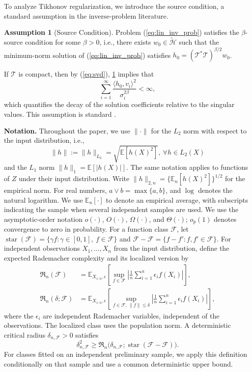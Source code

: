 \documentclass[12pt]{article}
\theoremstyle{plain}
\theoremstyle{definition}
\newtheorem{assumption}[theorem]{Assumption}
\theoremstyle{remark}
\begin{document}
To analyze Tikhonov regularization, we introduce the source condition, a standard assumption in the inverse-problem literature. 
\begin{assumption}[Source Condition]\label{asp:source_condition}
Problem (\ref{eq:lin_inv_prob}) satisfies the $ \beta $-source condition for some $ \beta  >0$, i.e., there exists $ w_{0} \in \tilde{\mathcal{H}}$ such that the minimum-norm solution of (\ref{eq:lin_inv_prob}) satisfies $ h_{0} =\left(\mathcal{T}^{*}\mathcal{T}\right)^{\beta /2} w_{0}$.
\end{assumption}

If $\mathcal{T}$ is compact, then by (\ref{eq:svd}), \cref{asp:source_condition} implies that 
$$ \sum_{i=1}^\infty \frac{\langle h_0,v_i \rangle^2}{\sigma^{2\beta}_i} < \infty, $$
which quantifies the decay of the solution coefficients relative to the singular values. This assumption is standard \citep{morozov1966solution,darollesNonparametricInstrumentalRegression2011,li2024regularized,bennettInferenceStronglyIdentified2023a,bennett2023source}.


\textbf{Notation.} Throughout the paper, we use $ \| \cdotp \| $ for the $ L_{2}$ norm with respect to the input distribution, i.e., \[
\| h\| :=\| h\| _{L_{2}} =\sqrt{\mathbb{E}[ h( X)^2]} ,\ \forall h\in L_{2}( X)
\]
and the $L_1$ norm $\|h\|_1=\mathbb E[|h(X)|]$. The same notation applies to functions of $Z$ under their input distribution. Write $\|h\|_{2,n}=\{\mathbb E_n[h(X)^2]\}^{1/2}$ for the empirical norm. For real numbers, $a\vee b=\max\{a,b\}$, and $\log$ denotes the natural logarithm. We use $\mathbb E_n[\cdot]$ to denote an empirical average, with subscripts indicating the sample when several independent samples are used. We use the asymptotic-order notation $o(\cdot)$, $O(\cdot)$, $\Omega(\cdot)$, and $\Theta(\cdot)$; $o_p(1)$ denotes convergence to zero in probability. For a function class $\mathcal F$, let $\operatorname{star}(\mathcal F)=\{\gamma f:\gamma\in[0,1],\ f\in\mathcal F\}$ and $\mathcal F-\mathcal F=\{f-f':f,f'\in\mathcal F\}$. For independent observations $X_1,\ldots,X_n$ from the input distribution, define the expected Rademacher complexity and its localized version by
\begin{align*}
\mathfrak R_n(\mathcal F)&=\mathbb E_{X_{1:n},\epsilon}\left[\sup_{f\in\mathcal F}\left|\frac1n\sum_{i=1}^n\epsilon_i f(X_i)\right|\right],\\
\mathfrak R_n(\delta;\mathcal F)&=\mathbb E_{X_{1:n},\epsilon}\left[\sup_{f\in\mathcal F,\,\|f\|\leqslant\delta}\left|\frac1n\sum_{i=1}^n\epsilon_i f(X_i)\right|\right],
\end{align*}
where the $\epsilon_i$ are independent Rademacher variables, independent of the observations. The localized class uses the population norm. A deterministic critical radius $\delta_{n,\mathcal F}>0$ satisfies
\[
\delta_{n,\mathcal F}^2\geqslant \mathfrak R_n\bigl(\delta_{n,\mathcal F};\operatorname{star}(\mathcal F-\mathcal F)\bigr).
\]
For classes fitted on an independent preliminary sample, we apply this definition conditionally on that sample and use a common deterministic upper bound.
\end{document}
